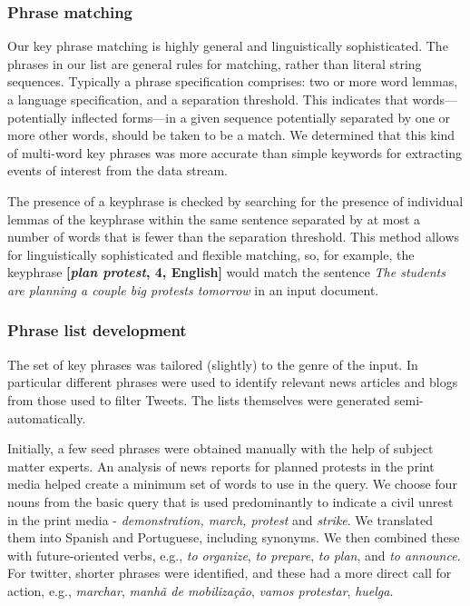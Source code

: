 \documentclass[letterpaper]{article}
\begin{document}
\vspace{-0.5em}
\subsubsection{Phrase matching}
Our key phrase matching is highly general and linguistically
sophisticated.  The phrases in our list are general rules for
matching, rather than literal string sequences. Typically a phrase
specification comprises: two or more word lemmas, a language
specification, and a separation threshold. This indicates that words---potentially inflected forms---in 
a given sequence potentially separated by one or more other words, should be taken to be a
match. We determined that this kind of
multi-word key phrases was more accurate than simple keywords for
extracting events of interest from the data stream.

The presence of a keyphrase is checked by searching for the presence of
individual lemmas of the keyphrase within the same sentence separated
by at most a number of words that is fewer than the separation threshold.  
This method allows for linguistically sophisticated and flexible matching, so, for example,
the keyphrase {\bf [{\em plan protest}, 4, English]} would match the sentence
{\em The students are planning a couple big protests tomorrow} in an input document.

\vspace{-0.5em}
\subsubsection{Phrase list development}
\label{sec:phraselearning}
The set of key phrases was tailored (slightly) to the genre of the
input. In particular different phrases were used to identify relevant
news articles and blogs from those used to filter Tweets.  The lists
themselves were generated semi-automatically.

Initially, a few seed phrases were obtained manually
with the help of subject matter experts.
An analysis of news reports for planned protests in the print media helped create a
minimum set of words to use in the query.  We choose four nouns from
the basic query that is used predominantly to indicate a civil unrest
in the print media - {\em demonstration, march, protest} and
{\it strike}. We translated them into Spanish and Portuguese, including
synonyms.  We then combined these with future-oriented verbs, e.g., {\em to organize}, {\em to prepare}, {\em to
plan}, and {\em to announce}. For twitter, shorter phrases were identified, and these had
a more direct call for action, e.g., {\em marchar}, {\em manhã de mobilização}, {\em
  vamos protestar}, {\em huelga}.
\end{document}
